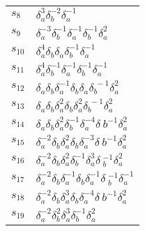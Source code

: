 \documentclass{article}
\begin{document}
\begin{center}
\begin{tabular}{ll}
$s_{8}$ & $\delta_a^{3}\delta_b^{-2}\delta_a^{-1}$ \\
$s_{9}$ & $\delta_a^{-3}\delta_b^{-1}\delta_a^{-1}\delta_b^{-1}\delta_a^{2}$ \\
$s_{10}$ & $\delta_a^{4}\delta_b^{}\delta_a^{}\delta_b^{-1}\delta_a^{-1}$ \\
$s_{11}$ & $\delta_a^{4}\delta_b^{-1}\delta_a^{-1}\delta_b^{-1}\delta_a^{-1}$ \\
$s_{12}$ & $\delta_a^{}\delta_b^{}\delta_a^{-1}\delta_b^{}\delta_a^{}\delta_b^{\
-1}\delta_a^{2}$ \\
$s_{13}$ & $\delta_a^{}\delta_b^{}\delta_a^{2}\delta_b^{}\delta_a^{2}\delta_b^{\
-1}\delta_a^{2}$ \\
$s_{14}$ & $\delta_a^{}\delta_b^{}\delta_a^{2}\delta_b^{-1}\delta_a^{-4}\delta_\
b^{-1}\delta_a^{2}$ \\
$s_{15}$ & $\delta_a^{-2}\delta_b^{}\delta_a^{2}\delta_b^{}\delta_a^{-3}\delta_\
b^{-1}\delta_a^{2}$ \\
$s_{16}$ & $\delta_a^{-2}\delta_b^{}\delta_a^{2}\delta_b^{-1}\delta_a^{3}\delta\
_b^{-1}\delta_a^{2}$ \\
$s_{17}$ & $\delta_a^{-2}\delta_b^{}\delta_a^{-1}\delta_b^{}\delta_a^{-1}\delta\
_b^{-1}\delta_a^{-1}$ \\
$s_{18}$ & $\delta_a^{-2}\delta_b^{}\delta_a^{3}\delta_b^{}\delta_a^{-4}\delta_\
b^{-1}\delta_a^{2}$ \\
$s_{19}$ & $\delta_a^{-2}\delta_b^{2}\delta_a^{3}\delta_b^{-1}\delta_a^{2}$ \\
\bottomrule
\end{tabular}
\end{center}

\thispagestyle{empty}
\end{document}
